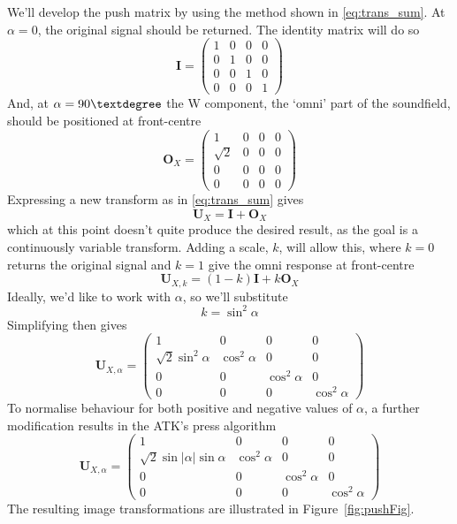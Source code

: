 \documentclass[12pt]{article}
\providecommand{\abs}[1]{\lvert#1\rvert}
\begin{document}
We'll develop the push matrix by using the method shown in \eqref{eq:trans_sum}. At \(\alpha = 0\), the original signal should be returned. The identity matrix will do so\begin{equation}
\mathbf{I} = \begin{pmatrix}
	1 & 0 & 0 & 0\\
	0 & 1 & 0 & 0\\
	0 & 0 & 1 & 0\\
	0 & 0 & 0 & 1
\end{pmatrix}
\end{equation} And, at \(\alpha = 90\textdegree\) the W component, the `omni' part of the soundfield, should be positioned at front-centre\begin{equation}
\mathbf{O}_{X} = \begin{pmatrix}
	1 & 0 & 0 & 0\\
	\sqrt{2} & 0 & 0 & 0\\
	0 & 0 & 0 & 0\\
	0 & 0 & 0 & 0
\end{pmatrix}
\end{equation} Expressing a new transform as in \eqref{eq:trans_sum} gives\begin{equation}
	\mathbf{U}_{X} = \mathbf{I} + \mathbf{O}_{X}
\end{equation} which at this point doesn't quite produce the desired result, as the goal is a continuously variable transform. Adding a scale, \(k\), will allow this, where \(k = 0\) returns the original signal and \(k=1\) give the omni response at front-centre\begin{equation}
	\mathbf{U}_{X, k} = (1 - k)\mathbf{I} + k\mathbf{O}_{X}
\end{equation} Ideally, we'd like to work with \(\alpha\), so we'll substitute\begin{equation}
	k = \sin^2{\alpha}
\end{equation} Simplifying then gives\begin{equation}
\mathbf{U}_{X, \alpha} = \begin{pmatrix}
	1 & 0 & 0 & 0\\
	\sqrt{2}\sin^2{\alpha} & \cos^2{\alpha} & 0 & 0\\
	0 & 0 & \cos^2{\alpha} & 0\\
	0 & 0 & 0 & \cos^2{\alpha}
\end{pmatrix}
\end{equation} To normalise behaviour for both positive and negative values of \(\alpha\), a further modification results in the ATK's press algorithm \begin{equation}
\mathbf{U}_{X, \alpha} = \begin{pmatrix}
	1 & 0 & 0 & 0\\
	\sqrt{2}\sin{\abs{\alpha}}\sin{\alpha} & \cos^2{\alpha} & 0 & 0\\
	0 & 0 & \cos^2{\alpha} & 0\\
	0 & 0 & 0 & \cos^2{\alpha}
\end{pmatrix}
\end{equation} The resulting image transformations are illustrated in Figure~\ref{fig:pushFig}. 
\end{document}
